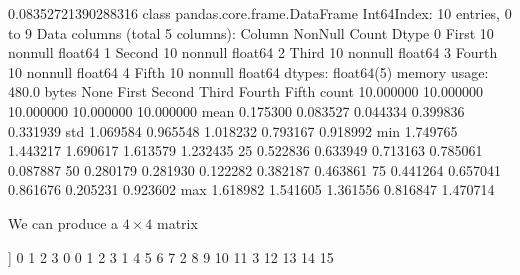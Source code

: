 \documentclass[letterpaper,10pt,english]{sphinxmanual}
\begin{document}
\begin{sphinxVerbatim}[commandchars=\\\{\}]
0.08352721390288316
\PYGZlt{}class \PYGZsq{}pandas.core.frame.DataFrame\PYGZsq{}\PYGZgt{}
Int64Index: 10 entries, 0 to 9
Data columns (total 5 columns):
 \PYGZsh{}   Column  Non\PYGZhy{}Null Count  Dtype  
\PYGZhy{}\PYGZhy{}\PYGZhy{}  \PYGZhy{}\PYGZhy{}\PYGZhy{}\PYGZhy{}\PYGZhy{}\PYGZhy{}  \PYGZhy{}\PYGZhy{}\PYGZhy{}\PYGZhy{}\PYGZhy{}\PYGZhy{}\PYGZhy{}\PYGZhy{}\PYGZhy{}\PYGZhy{}\PYGZhy{}\PYGZhy{}\PYGZhy{}\PYGZhy{}  \PYGZhy{}\PYGZhy{}\PYGZhy{}\PYGZhy{}\PYGZhy{}  
 0   First   10 non\PYGZhy{}null     float64
 1   Second  10 non\PYGZhy{}null     float64
 2   Third   10 non\PYGZhy{}null     float64
 3   Fourth  10 non\PYGZhy{}null     float64
 4   Fifth   10 non\PYGZhy{}null     float64
dtypes: float64(5)
memory usage: 480.0 bytes
None
           First     Second      Third     Fourth      Fifth
count  10.000000  10.000000  10.000000  10.000000  10.000000
mean   \PYGZhy{}0.175300   0.083527  \PYGZhy{}0.044334  \PYGZhy{}0.399836   0.331939
std     1.069584   0.965548   1.018232   0.793167   0.918992
min    \PYGZhy{}1.749765  \PYGZhy{}1.443217  \PYGZhy{}1.690617  \PYGZhy{}1.613579  \PYGZhy{}1.232435
25\PYGZpc{}    \PYGZhy{}0.522836  \PYGZhy{}0.633949  \PYGZhy{}0.713163  \PYGZhy{}0.785061   0.087887
50\PYGZpc{}    \PYGZhy{}0.280179   0.281930  \PYGZhy{}0.122282  \PYGZhy{}0.382187   0.463861
75\PYGZpc{}     0.441264   0.657041   0.861676  \PYGZhy{}0.205231   0.923602
max     1.618982   1.541605   1.361556   0.816847   1.470714
\end{sphinxVerbatim}

\noindent{}

\noindent{}

We can produce a \(4\times 4\) matrix

\begin{sphinxVerbatim}[commandchars=\\\{\}]
  
  
\end{sphinxVerbatim}

\begin{sphinxVerbatim}[commandchars=\\\{\}]
[[ 0  1  2  3]
 [ 4  5  6  7]
 [ 8  9 10 11]
 [12 13 14 15]]
    0   1   2   3
0   0   1   2   3
1   4   5   6   7
2   8   9  10  11
3  12  13  14  15
\end{sphinxVerbatim}
\end{document}
